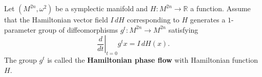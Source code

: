 Let $(M^{2n}, \omega^2)$ be a symplectic manifold and $H: M^{2n} \to \mathbb{R}$ a function. Assume that the Hamiltonian vector field $I\,dH$ corresponding to $H$ generates a $1$-parameter group of diffeomorphisms $g^t: M^{2n} \to M^{2n}$ satisfying
$$
\left. \frac{d}{dt} \right|_{t=0} g^t x = I\,dH(x).
$$
The group $g^t$ is called the \textbf{Hamiltonian phase flow} with Hamiltonian function $H$.
